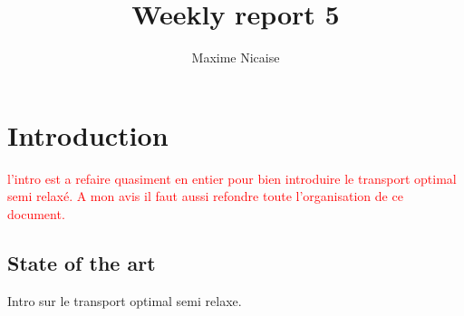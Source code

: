 \documentclass[twoside]{article}
\title{Weekly report 5}
\author{Maxime Nicaise}
\begin{document}
%
%
\makeRR   %

\clearpage
\tableofcontents
\clearpage
\section{Introduction}
\textcolor{red}{l'intro est a refaire quasiment en entier pour bien introduire le transport optimal semi relaxé. A mon avis il faut aussi refondre toute l'organisation de ce document.}
\subsection{State of the art}
Intro sur le transport optimal semi relaxe. 
\end{document}
